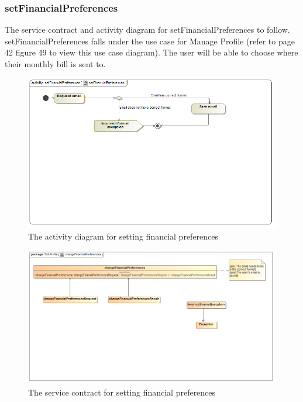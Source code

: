 \documentclass[a4paper,12pt]{report}
\begin{document}
\subsubsection{setFinancialPreferences}
The service contract and activity diagram for setFinancialPreferences to follow. setFinancialPreferences falls under the use case for Manage Profile (refer to page 42 figure 49 to view this use case diagram). The user will be able to choose where their monthly bill  is sent to.
\begin{figure}[H]
  \centering
    \includegraphics[width=1.0\textwidth]{../Diagrams/ManageProfile/ActivityDiagrams/setFinancialPreferences1.png}
    \caption{The activity diagram for setting financial preferences} 
\end{figure}

\begin{figure}[H]
	\centering
	\includegraphics[width=1.0\textwidth]{../Diagrams/ManageProfile/serviceContracts/changeFinancialPreferencesServiceContract.png}
	\caption{The service contract for setting financial preferences}
\end{figure}
\end{document}
